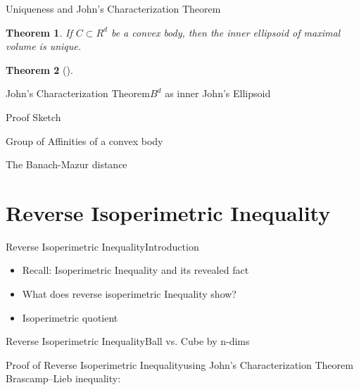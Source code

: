 \documentclass[
  english,            %
  aspectratio=169,    %
]{tumbeamer}
\newtheorem{theorem}{Theorem}
\begin{document}
\begin{frame}{Uniqueness and John's Characterization Theorem}
\centering
\begin{theorem}
  If $C \subset R^{d}$ be a convex body, then the inner ellipsoid of maximal volume is unique.
\end{theorem}
\begin{theorem}[]

\end{theorem}
\end{frame}

\begin{frame}{John's Characterization Theorem}{$B^{d}$ as inner John's Ellipsoid}

\end{frame}

\begin{frame}{Proof Sketch}

\end{frame}

\begin{frame}{Group of Affinities of a convex body}

\end{frame}

\begin{frame}{The Banach-Mazur distance}

\end{frame}

\section{Reverse Isoperimetric Inequality}
\begin{frame}{Reverse Isoperimetric Inequality}{Introduction}
  \begin{itemize}
    \item Recall: Isoperimetric Inequality and its revealed fact
    \item What does reverse isoperimetric Inequality show?
    \item Isoperimetric quotient
  \end{itemize}
\end{frame}

\begin{frame}{Reverse Isoperimetric Inequality}{Ball vs. Cube by n-dims}

\end{frame}

\begin{frame}{Proof of Reverse Isoperimetric Inequality}{using John's Characterization Theorem}
Brascamp–Lieb inequality:

\end{frame}
\end{document}
